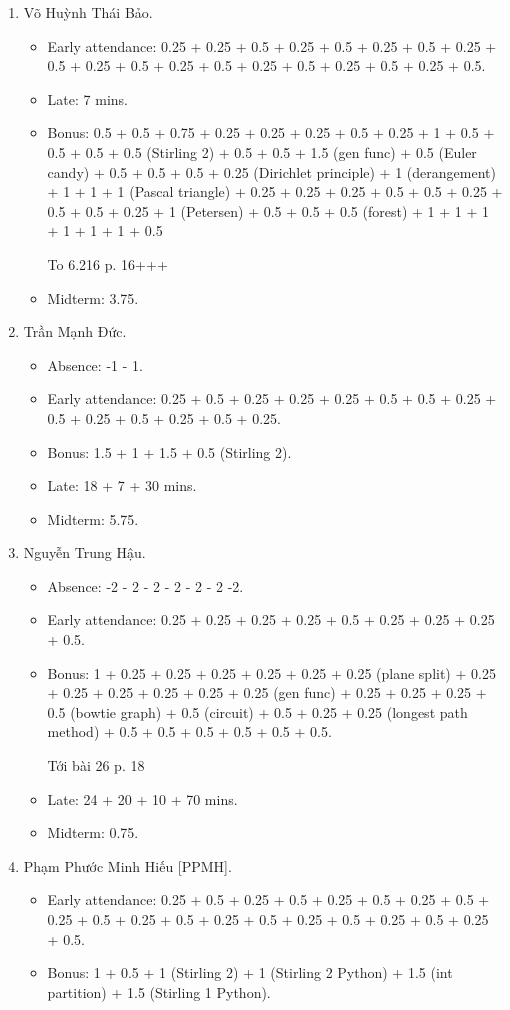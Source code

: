 \documentclass{article}
\begin{document}
\begin{enumerate}
\begin{itemize}
	\end{itemize}
	\item {\sc Võ Huỳnh Thái Bảo.}
	\begin{itemize}
		\item Early attendance: 0.25 + 0.25 + 0.5 + 0.25 + 0.5 + 0.25 + 0.5 + 0.25 + 0.5 + 0.25 + 0.5 + 0.25 + 0.5 + 0.25 + 0.5 + 0.25 + 0.5 + 0.25 + 0.5.
		\item Late: 7 mins.
		\item Bonus: 0.5 + 0.5 + 0.75 + 0.25 + 0.25 + 0.25 + 0.5 + 0.25 + 1 + 0.5 + 0.5 + 0.5 + 0.5 (Stirling 2) + 0.5 + 0.5 + 1.5 (gen func) + 0.5 (Euler candy) + 0.5 + 0.5 + 0.5 + 0.25 (Dirichlet principle) + 1 (derangement) + 1 + 1 + 1 (Pascal triangle) + 0.25 + 0.25 + 0.25 + 0.5 + 0.5 + 0.25 + 0.5 + 0.5 + 0.25 + 1 (Petersen) + 0.5 + 0.5 + 0.5 (forest) + 1 + 1 + 1 + 1 + 1 + 1 + 0.5

        To 6.216 p. 16+++
        \item Midterm: 3.75.
	\end{itemize}
	\item {\sc Trần Mạnh Đức.}
	\begin{itemize}
		\item Absence: -1 - 1.
		\item Early attendance: 0.25 + 0.5 + 0.25 + 0.25 + 0.25 + 0.5 + 0.5 + 0.25 + 0.5 + 0.25 + 0.5 + 0.25 + 0.5 + 0.25.
		\item Bonus: 1.5 + 1 + 1.5 + 0.5 (Stirling 2).
		\item Late: 18 + 7 + 30 mins.
        \item Midterm: 5.75.
	\end{itemize}
	\item {\sc Nguyễn Trung Hậu.}
	\begin{itemize}
		\item Absence: -2 - 2 - 2 - 2 - 2 - 2 -2.
		\item Early attendance: 0.25 + 0.25 + 0.25 + 0.25 + 0.5 + 0.25 + 0.25 + 0.25 + 0.5.
		\item Bonus: 1 + 0.25 + 0.25 + 0.25 + 0.25 + 0.25 + 0.25 (plane split) + 0.25 + 0.25 + 0.25 + 0.25 + 0.25 + 0.25 (gen func) + 0.25 + 0.25 + 0.25 + 0.5 (bowtie graph) + 0.5 (circuit) + 0.5 + 0.25 + 0.25 (longest path method) + 0.5 + 0.5 + 0.5 + 0.5 + 0.5 + 0.5.

        Tới bài 26 p. 18
		\item Late: 24 + 20 + 10 + 70 mins.
        \item Midterm: 0.75.
	\end{itemize}
	\item {\sc Phạm Phước Minh Hiếu [PPMH].}
	\begin{itemize}
		\item Early attendance: 0.25 + 0.5 + 0.25 + 0.5 + 0.25 + 0.5 + 0.25 + 0.5 + 0.25 + 0.5 + 0.25 + 0.5 + 0.25 + 0.5 + 0.25 + 0.5 + 0.25 + 0.5 + 0.25 + 0.5.
		\item Bonus: 1 + 0.5 + 1 (Stirling 2) + 1 (Stirling 2 Python) + 1.5 (int partition) + 1.5 (Stirling 1 Python).


\end{itemize}
\end{enumerate}
\end{document}
